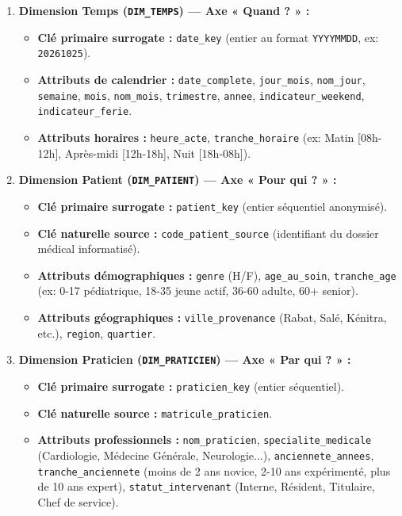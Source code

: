 \documentclass[11pt, a4paper]{article}
\begin{document}
\begin{enumerate}[label=\textbf{\alph*.}]
    \item \textbf{Dimension Temps (\texttt{DIM\_TEMPS}) — Axe « Quand ? » :}
    \begin{itemize}
        \item \textbf{Clé primaire surrogate :} \texttt{date\_key} (entier au format \texttt{YYYYMMDD}, ex: \texttt{20261025}).
        \item \textbf{Attributs de calendrier :} \texttt{date\_complete}, \texttt{jour\_mois}, \texttt{nom\_jour}, \texttt{semaine}, \texttt{mois}, \texttt{nom\_mois}, \texttt{trimestre}, \texttt{annee}, \texttt{indicateur\_weekend}, \texttt{indicateur\_ferie}.
        \item \textbf{Attributs horaires :} \texttt{heure\_acte}, \texttt{tranche\_horaire} (ex: Matin [08h-12h], Après-midi [12h-18h], Nuit [18h-08h]).
    \end{itemize}

    \item \textbf{Dimension Patient (\texttt{DIM\_PATIENT}) — Axe « Pour qui ? » :}
    \begin{itemize}
        \item \textbf{Clé primaire surrogate :} \texttt{patient\_key} (entier séquentiel anonymisé).
        \item \textbf{Clé naturelle source :} \texttt{code\_patient\_source} (identifiant du dossier médical informatisé).
        \item \textbf{Attributs démographiques :} \texttt{genre} (H/F), \texttt{age\_au\_soin}, \texttt{tranche\_age} (ex: 0-17 pédiatrique, 18-35 jeune actif, 36-60 adulte, 60+ senior).
        \item \textbf{Attributs géographiques :} \texttt{ville\_provenance} (Rabat, Salé, Kénitra, etc.), \texttt{region}, \texttt{quartier}.
    \end{itemize}

    \item \textbf{Dimension Praticien (\texttt{DIM\_PRATICIEN}) — Axe « Par qui ? » :}
    \begin{itemize}
        \item \textbf{Clé primaire surrogate :} \texttt{praticien\_key} (entier séquentiel).
        \item \textbf{Clé naturelle source :} \texttt{matricule\_praticien}.
        \item \textbf{Attributs professionnels :} \texttt{nom\_praticien}, \texttt{specialite\_medicale} (Cardiologie, Médecine Générale, Neurologie...), \texttt{anciennete\_annees}, \texttt{tranche\_anciennete} (moins de 2 ans novice, 2-10 ans expérimenté, plus de 10 ans expert), \texttt{statut\_intervenant} (Interne, Résident, Titulaire, Chef de service).
    \end{itemize}
\end{enumerate}
\end{document}
